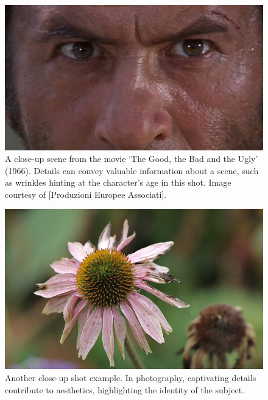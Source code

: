 \begin{figure}[ht]
  \centering

    \includegraphics[width=\linewidth]{Images/A scene from ‘The Good, the Bad and the Ugly’ (1966). Image courtesy- Produzioni Europee Associati .jpg}

   \caption{A close-up scene from the movie ‘The Good, the Bad and the Ugly’ (1966). Details can convey valuable information about a scene, such as wrinkles hinting at the character's age in this shot. Image courtesy of [Produzioni Europee Associati].}
   \label{fig:close-up1}
\end{figure}


\begin{figure}%
  \centering
   \includegraphics[width=\linewidth]{Images/flower-closeup.JPG}
   
   \caption{Another close-up shot example. In photography, captivating details contribute to aesthetics, highlighting the identity of the subject.}
   \label{fig:close-up2}
\end{figure}

